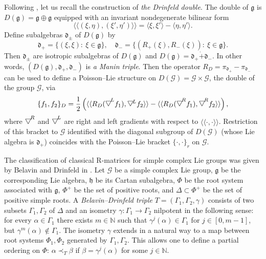 \documentclass{amsart}
\theoremstyle{definition}
\theoremstyle{remark}
\numberwithin{equation}{section}
\numberwithin{theorem}{section}
\begin{document}
Following \cite{r-sts}, let us recall the construction of {\em the Drinfeld double}. The double of ${\mathfrak g}$ is 
$D({\mathfrak g})={\mathfrak g}  \oplus {\mathfrak g}$ equipped with an invariant nondegenerate bilinear form
$$
\langle\langle (\xi,\eta), (\xi',\eta')\rangle\rangle = \langle \xi, \xi'\rangle - \langle \eta, \eta'\rangle. 
$$
Define subalgebras ${{\mathfrak d}}_\pm$ of $D({\mathfrak g})$ by
\begin{equation}\label{ddeco}
{{\mathfrak d}}_+=\{( \xi,\xi){{:\ }} \xi \in{\mathfrak g}\}, \quad {{\mathfrak d}}_-=\{ (R_+(\xi),R_-(\xi)){{:\ }} \xi \in{\mathfrak g}\}.
\end{equation}
Then ${{\mathfrak d}}_\pm$ are isotropic subalgebras of $D({\mathfrak g})$ and $D({\mathfrak g})= {{\mathfrak d}}_+ \dot + {{\mathfrak d}}_-$. In other words,
$(D({\mathfrak g}), {{\mathfrak d}}_+, {{\mathfrak d}}_-)$ is {\em a Manin triple}. Then the operator $R_D= \pi_{{{\mathfrak d}}_+} - \pi_{{{\mathfrak d}}_-}$ can be used to define 
a Poisson--Lie structure on $D({{\mathcal G}})={{\mathcal G}}\times {{\mathcal G}}$, the double of the group ${{\mathcal G}}$, via
\begin{equation}
\{f_1,f_2\}_D = \frac{1}{2}\left (\langle\langle R_D({{\raisebox{2pt}{$\bigtriangledown$}}\negthinspace}^L f_1), {{\raisebox{2pt}{$\bigtriangledown$}}\negthinspace}{^L} f_2 \rangle\rangle 
- \langle\langle R_D({{\raisebox{2pt}{$\bigtriangledown$}}\negthinspace}^R f_1), {{\raisebox{2pt}{$\bigtriangledown$}}\negthinspace}^R f_2 \rangle\rangle \right),
\label{sklyadouble}
\end{equation}
where ${{\raisebox{2pt}{$\bigtriangledown$}}\negthinspace}^R$ and ${{\raisebox{2pt}{$\bigtriangledown$}}\negthinspace}^L$ are right and left gradients with respect to $\langle\langle \cdot ,\cdot \rangle\rangle$.
Restriction of this bracket to ${{\mathcal G}}$ identified with the diagonal subgroup of $D({{\mathcal G}})$ (whose Lie algebra is ${{\mathfrak d}}_+$) 
coincides with the Poisson--Lie bracket ${{\{\cdot,\cdot\}}}_r$ on ${{\mathcal G}}$.

The classification of classical R-matrices for simple complex Lie groups was given by Belavin and Drinfeld in \cite{BD}. Let ${{\mathcal G}}$ be a simple complex Lie group,
${\mathfrak g}$ be the corresponding Lie algebra, ${\mathfrak h}$ be its Cartan subalgebra,
$\Phi$ be the root system associated with ${\mathfrak g}$, $\Phi^+$ be the set of positive roots, and $\Delta\subset \Phi^+$ be the 
set of positive simple roots. 
A {\em Belavin--Drinfeld triple} $T=(\Gamma_1,\Gamma_2, \gamma)$
consists of two subsets $\Gamma_1,\Gamma_2$ of $\Delta$ and an isometry $\gamma:\Gamma_1\to\Gamma_2$ nilpotent in the 
following sense: for every $\alpha \in \Gamma_1$ there exists $m\in\mathbb{N}$ such that $\gamma^j(\alpha)\in \Gamma_1$ for $j\in [0,m-1]$, but $\gamma^m(\alpha)\notin \Gamma_1$. The isometry $\gamma$ extends in a natural way to a map between root systems $\Phi_1, \Phi_2$ generated by $\Gamma_1, \Gamma_2$. This allows one to define a partial ordering on $\Phi$: $\alpha \prec_T \beta$ if $\beta=\gamma^j(\alpha)$ for some $j\in \mathbb{N}$. 
\end{document}
